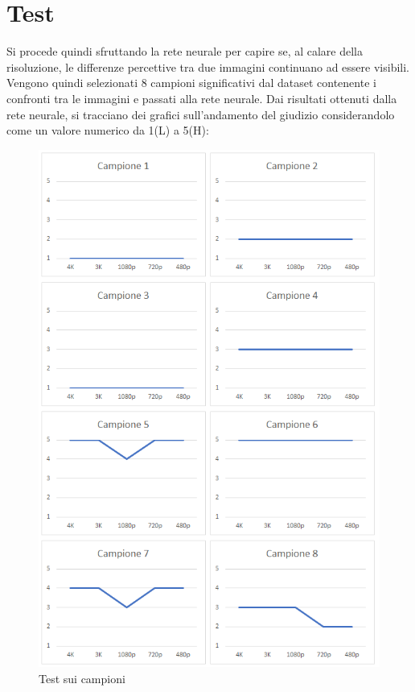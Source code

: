 \documentclass[a4paper,11pt]{article}
\begin{document}
    \section{Test}
    Si procede quindi sfruttando la rete neurale per capire se, al calare della risoluzione, le differenze percettive tra due immagini continuano ad essere visibili.
    Vengono quindi selezionati 8 campioni significativi dal dataset contenente i confronti tra le immagini e passati alla rete neurale. 
    Dai risultati ottenuti dalla rete neurale, si tracciano dei grafici sull'andamento del giudizio considerandolo come un valore numerico da 1(L) a 5(H):
    \begin{figure}[h]
        \centering
        \includegraphics[scale=0.48]{campioni}
        \caption{Test sui campioni}
    \end{figure}
\end{document}
